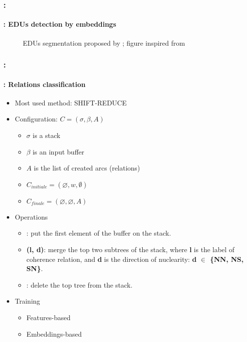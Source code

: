 \documentclass[xcolor=table]{beamer}
\begin{document}
\begin{frame}
	\frametitle{\insertshortsubtitle: \insertsection}
	\framesubtitle{\insertsubsection: EDUs detection by embeddings}
	
	\begin{figure}
		\centering
		\caption{EDUs segmentation proposed by \cite{2018-wang-al}; figure inspired from \cite{2019-jurafsky-martin}}
	\end{figure}
	
\end{frame}

\begin{frame}
	\frametitle{\insertshortsubtitle: \insertsection}
	\framesubtitle{\insertsubsection: Relations classification}
	
	\begin{minipage}{.6\textwidth}
	\begin{itemize}
		\item Most used method: SHIFT-REDUCE
		\item Configuration: $C = (\sigma, \beta, A)$
		\begin{itemize}
			\item $\sigma$ is a stack
			\item $\beta$ is an input buffer
			\item $A$ is the list of created arcs (relations)
			\item $C_{initiale} = (\varnothing, w, \emptyset)$
			\item $C_{finale} = (\varnothing, \varnothing, A)$
		\end{itemize}
	\end{itemize}
	\end{minipage}
	\begin{minipage}{.38\textwidth}
	\end{minipage}
	\begin{itemize}
		\item Operations 
		\begin{itemize}
			\item {}: put the first element of the buffer on the stack.
			\item {}\textbf{(l, d)}: merge the top two subtrees of the stack, where \textbf{l} is the label of coherence relation, and \textbf{d} is the direction of nuclearity: \textbf{d $ \in $ \{NN, NS, SN\}}.
			\item {}: delete the top tree from the stack.
		\end{itemize}
		\item Training 
		\begin{itemize}
			\item Features-based
			\item Embeddings-based
		\end{itemize}
	\end{itemize}
	
\end{frame}
\end{document}
